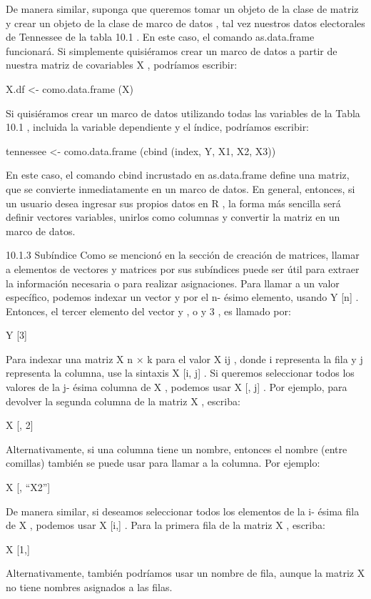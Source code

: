 \documentclass[
]{book}
\begin{document}
De manera similar, suponga que queremos tomar un objeto de la clase de matriz y crear un objeto de la clase de marco de datos , tal vez nuestros datos electorales de Tennessee de la tabla 10.1 . En este caso, el comando as.data.frame funcionará. Si simplemente quisiéramos crear un marco de datos a partir de nuestra matriz de covariables X , podríamos escribir:

X.df \textless- como.data.frame (X)

Si quisiéramos crear un marco de datos utilizando todas las variables de la Tabla 10.1 , incluida la variable dependiente y el índice, podríamos escribir:

tennessee \textless- como.data.frame (cbind (index, Y, X1, X2, X3))

En este caso, el comando cbind incrustado en as.data.frame define una matriz, que se convierte inmediatamente en un marco de datos. En general, entonces, si un usuario desea ingresar sus propios datos en R , la forma más sencilla será definir vectores variables, unirlos como columnas y convertir la matriz en un marco de datos.

10.1.3 Subíndice
Como se mencionó en la sección de creación de matrices, llamar a elementos de vectores y matrices por sus subíndices puede ser útil para extraer la información necesaria o para realizar asignaciones. Para llamar a un valor específico, podemos indexar un vector y por el n- ésimo elemento, usando Y {[}n{]} . Entonces, el tercer elemento del vector y , o y 3 , es llamado por:

Y {[}3{]}

Para indexar una matriz X n × k para el valor X ij , donde i representa la fila y j representa la columna, use la sintaxis X {[}i, j{]} . Si queremos seleccionar todos los valores de la j- ésima columna de X , podemos usar X {[}, j{]} . Por ejemplo, para devolver la segunda columna de la matriz X , escriba:

X {[}, 2{]}

Alternativamente, si una columna tiene un nombre, entonces el nombre (entre comillas) también se puede usar para llamar a la columna. Por ejemplo:

X {[}, ``X2''{]}

De manera similar, si deseamos seleccionar todos los elementos de la i- ésima fila de X , podemos usar X {[}i,{]} . Para la primera fila de la matriz X , escriba:

X {[}1,{]}

Alternativamente, también podríamos usar un nombre de fila, aunque la matriz X no tiene nombres asignados a las filas.
\end{document}
